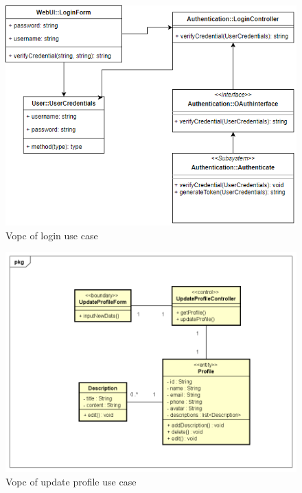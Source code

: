 \documentclass[a4paper]{article}
\begin{document}
\begin{figure}[H]
  \centering
  \includegraphics[width=1.0\textwidth]{vopc_login.png}
  \caption{Vopc of login use case}
  \label{fig:fig23}
\end{figure}

\begin{figure}[H]
  \centering
  \includegraphics[width=1.0\textwidth]{vopc_update_profile.png}
  \caption{Vopc of update profile use case}
  \label{fig:fig24}
\end{figure}
\end{document}
